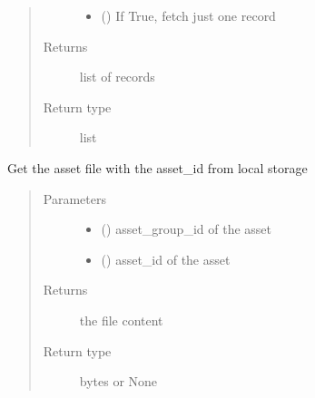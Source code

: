 \documentclass[letterpaper,10pt,english]{sphinxmanual}
\begin{document}
\begin{fulllineitems}
\begin{fulllineitems}
\begin{quote}
\begin{description}
\begin{itemize}
\item {} 
 () \textendash{} If True, fetch just one record

\end{itemize}

\item[{Returns}] \leavevmode
list of records

\item[{Return type}] \leavevmode
list

\end{description}\end{quote}

\end{fulllineitems}


\begin{fulllineitems}
\label{\detokenize{bbc1.core.data_handler:bbc1.core.data_handler.DataHandler.get_in_storage}}
Get the asset file with the asset\_id from local storage
\begin{quote}\begin{description}
\item[{Parameters}] \leavevmode\begin{itemize}
\item {} 
 () \textendash{} asset\_group\_id of the asset

\item {} 
 () \textendash{} asset\_id of the asset

\end{itemize}

\item[{Returns}] \leavevmode
the file content

\item[{Return type}] \leavevmode
bytes or None

\end{description}\end{quote}

\end{fulllineitems}


\end{fulllineitems}
\end{document}
